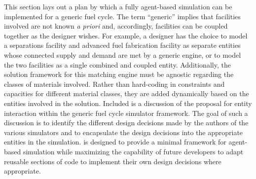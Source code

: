 This section lays out a plan by which a fully agent-based simulation can be
implemented for a generic fuel cycle. The term ``generic'' implies that
facilities involved are not known \textit{a priori} and, accordingly, facilities
can be coupled together as the designer wishes. For example, a designer has the
choice to model a separations facility and advanced fuel fabrication facility as
separate entities whose connected supply and demand are met by a generic engine,
or to model the two facilities as a single combined and coupled
entity. Additionally, the solution framework for this matching engine must be
agnostic regarding the classes of materials involved. Rather than hard-coding in
constraints and capacities for different material classes, they are added
dynamically based on the entities involved in the solution. Included is a
discussion of the proposal for entity interaction within the generic fuel cycle
simulator framework. The goal of such a discussion is to identify the different
design decisions made by the authors of the various simulators and to
encapsulate the design decisions into the appropriate entities in the \Cyclus
simulation. \Cyclus is designed to provide a minimal framework for agent-based
simulation while maximizing the capability of future developers to adapt
reusable sections of code to implement their own design decisions where
appropriate.


